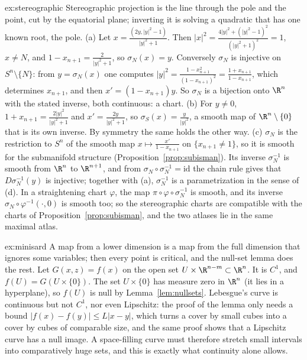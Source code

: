 \begin{solution}{ex:stereographic}
\idea Stereographic projection is the line through the pole and the point, cut by the equatorial plane; inverting it is solving a quadratic that has one
known root, the pole.
\writeup (a) Let $x=\frac{(2y,|y|^2-1)}{|y|^2+1}$. Then $|x|^2=\frac{4|y|^2+(|y|^2-1)^2}{(|y|^2+1)^2}=1$, $x\ne N$, and $1-x_{n+1}=\frac2{|y|^2+1}$, so
$\sigma_N(x)=y$. Conversely $\sigma_N$ is injective on $S^n\setminus\{N\}$: from $y=\sigma_N(x)$ one computes $|y|^2=\frac{1-x_{n+1}^2}{(1-x_{n+1})^2}=\frac{1+x_{n+1}}{1-x_{n+1}}$, which
determines $x_{n+1}$, and then $x'=(1-x_{n+1})y$. So $\sigma_N$ is a bijection onto $\R^n$ with the stated inverse, both continuous: a chart. (b) For
$y\ne0$, $1+x_{n+1}=\frac{2|y|^2}{|y|^2+1}$ and $x'=\frac{2y}{|y|^2+1}$, so $\sigma_S(x)=\frac y{|y|^2}$, a smooth map of $\R^n\setminus\{0\}$ that is its own inverse. By symmetry
the same holds the other way. (c) $\sigma_N$ is the restriction to $S^n$ of the smooth map $x\mapsto\frac{x'}{1-x_{n+1}}$ on $\{x_{n+1}\ne1\}$, so it is smooth
for the submanifold structure (Proposition~\ref{prop:subisman}). Its inverse $\sigma_N^{-1}$ is smooth from $\R^n$ to $\R^{n+1}$, and from
$\sigma_N\circ\sigma_N^{-1}=\mathrm{id}$ the chain rule gives that $D\sigma_N^{-1}(y)$ is injective; together with (a), $\sigma_N^{-1}$ is a parametrization in the
sense of (d). In a straightening chart $\varphi$, the map $\pi\circ\varphi\circ\sigma_N^{-1}$ is smooth, and its inverse $\sigma_N\circ\varphi^{-1}(\cdot,0)$ is
smooth too; so the stereographic charts are compatible with the charts of Proposition~\ref{prop:subisman}, and the two atlases lie in the same maximal atlas.
\end{solution}

\begin{solution}{ex:minisard}
\idea A map from a lower dimension is a map from the full dimension that ignores some variables; then every point is critical, and the null-set lemma
does the rest.
\writeup Let $G(x,z)=f(x)$ on the open set $U\times\R^{n-m}\subset\R^n$. It is $C^1$, and $f(U)=G(U\times\{0\})$. The set $U\times\{0\}$ has measure zero in
$\R^n$ (it lies in a hyperplane), so $f(U)$ is null by Lemma~\ref{lem:nullsets}. Lebesgue's curve is continuous but not $C^1$, nor even Lipschitz: the
proof of the lemma only needs a bound $|f(x)-f(y)|\le L|x-y|$, which turns a cover by small cubes into a cover by cubes of comparable size, and the same
proof shows that a Lipschitz curve has a null image. A space-filling curve must therefore stretch small intervals into comparatively huge sets, and
this is exactly what continuity alone allows.
\end{solution}

